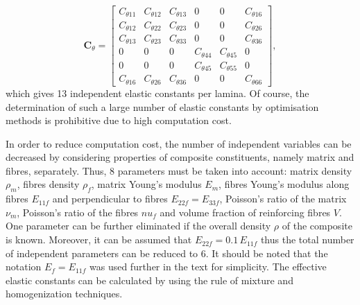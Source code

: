 \documentclass[preprint,12pt]{elsarticle}
\newcommand{\matr}[1]{\mathbf{#1}} %
\begin{document}
 \begin{equation}
 \matr{C}_{\theta} = \left[\begin{array}{cccccc} C_{\theta 11} & C_{\theta 12}& C_{\theta 13} & 0&0&C_{\theta 16}\\[2pt]
 C_{\theta 12}& C_{\theta 22} & C_{\theta 23}& 0 &0&C_{\theta 26}\\[2pt]
 C_{\theta 13}&C_{\theta 23}&C_{\theta 33}&0&0&C_{\theta 36}\\[2pt]
 0& 0&0&C_{\theta 44}& C_{\theta 45}&0\\[2pt]
 0&0&0&C_{\theta 45}&C_{\theta 55}&0\\[2pt]
 C_{\theta 16}&C_{\theta 26} &C_{\theta 36}&0&0&C_{\theta 66}
 \end{array}\right], 
 \label{eq:elastic_constatns_theta}
 \end{equation} 
 which gives 13 independent elastic constants per lamina. Of course, the determination of such a large number of elastic constants by optimisation methods is prohibitive due to high computation cost. 
 
 In order to reduce computation cost, the number of independent variables can be 
 decreased by considering properties of composite constituents, namely matrix and 
 fibres, separately. Thus,  8 parameters must be taken into account: matrix density 
 \(\rho_m\), fibres density \(\rho_f\), matrix Young's modulus \(E_m\), fibres Young's 
 modulus along fibres \(E_{11f}\) and perpendicular to fibres \(E_{22f}=E_{33f}\), 
 Poisson's ratio of the matrix \(\nu_m\), Poisson's ratio of the fibres \(nu_f\) and volume 
 fraction of reinforcing fibres \(V\). One parameter can be further eliminated if the 
 overall 
 density \(\rho\) of the composite is known. Moreover, it can be assumed that \(E_{22f} 
 = 
 0.1\, E_{11f}\) thus the total number of independent parameters can be reduced to 6. It 
 should be noted that the notation \(E_f = E_{11f}\) was used further in the text for 
 simplicity. The effective elastic constants can be calculated by using the rule of 
 mixture and homogenization techniques.
\end{document}
